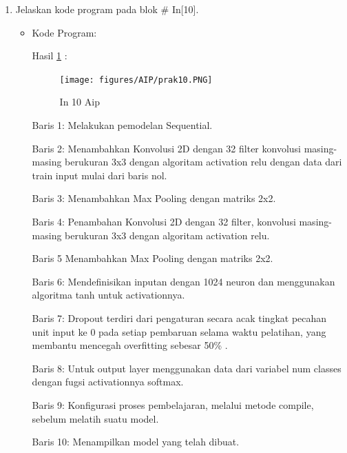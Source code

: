 \begin{enumerate}
\item Jelaskan kode program pada blok \# In[10].
\begin{itemize}
\item Kode Program:

\par Hasil \ref{in10aip} :
\begin{figure}[!hbtp]
\centering
\texttt{[image: figures/AIP/prak10.PNG]}
\caption{In 10 Aip}
\label{in10aip}
\end{figure}
\par Baris 1: Melakukan pemodelan Sequential.
\par Baris 2: Menambahkan Konvolusi 2D dengan 32 filter konvolusi masing-masing berukuran 3x3 dengan algoritam activation relu dengan data dari train input mulai dari baris nol.
\par Baris 3: Menambahkan Max Pooling dengan matriks 2x2.
\par Baris 4: Penambahan Konvolusi 2D dengan 32 filter, konvolusi masing-masing berukuran 3x3 dengan algoritam activation relu.
\par Baris 5 Menambahkan Max Pooling dengan matriks 2x2.
\par Baris 6: Mendefinisikan inputan dengan 1024 neuron dan menggunakan algoritma tanh untuk activationnya.
\par Baris 7: Dropout terdiri dari pengaturan secara acak tingkat pecahan unit input ke 0 pada setiap pembaruan selama waktu pelatihan, yang membantu mencegah overfitting sebesar 50\% .
\par Baris 8: Untuk output layer menggunakan data dari variabel num classes dengan fugsi activationnya softmax.
\par Baris 9: Konfigurasi proses pembelajaran, melalui metode compile, sebelum melatih suatu model.
\par Baris 10: Menampilkan model yang telah dibuat.
\end{itemize}
\par


\end{enumerate}
